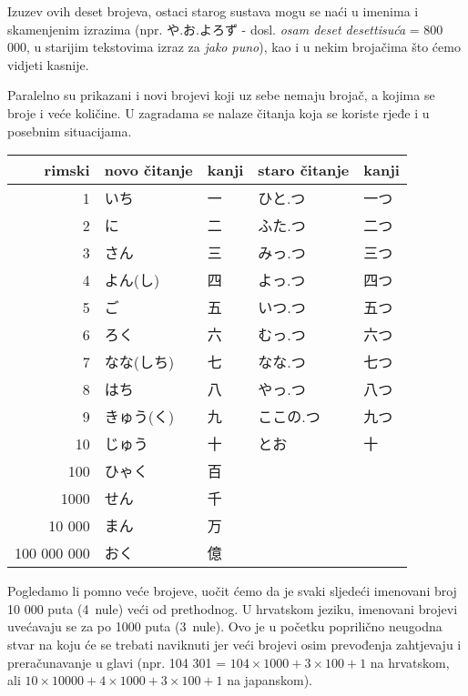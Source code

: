 	Izuzev ovih deset brojeva, ostaci starog sustava mogu se naći u imenima i skamenjenim izrazima (npr. や.お.よろず - dosl. \textit{osam deset desettisuća} = 800 000, u starijim tekstovima izraz za \textit{jako puno}), kao i u nekim brojačima što ćemo vidjeti kasnije.
	
	Paralelno su prikazani i novi brojevi koji uz sebe nemaju brojač, a kojima se broje i veće količine. U zagradama se nalaze čitanja koja se koriste rjeđe i u posebnim situacijama.
	
	\vspace{5pt}
	\begin{table}[h]
		\centering
		\begin{tabular}{r l l l l}\toprule[2pt]
			rimski & novo čitanje & kanji & staro čitanje & kanji\\
			\midrule
			1			& いち & 一 & ひと.つ & 一つ \\
			2			& に & 二 & ふた.つ & 二つ \\
			3			& さん & 三 & みっ.つ & 三つ \\
			4			& よん(し) & 四 & よっ.つ & 四つ \\
			5			& ご & 五 & いつ.つ & 五つ \\
			6			& ろく & 六 & むっ.つ & 六つ \\
			7			& なな(しち) & 七 & なな.つ & 七つ \\
			8			& はち & 八 & やっ.つ & 八つ \\
			9			& きゅう(く) & 九 & ここの.つ & 九つ \\
			10			& じゅう & 十 & とお & 十 \\
			100			& ひゃく & 百 &  &  \\
			1000		& せん & 千 &  &  \\
			10 000		& まん & 万 &  &  \\
			100 000 000	& おく & 億 &  &  \\
			\bottomrule
		\end{tabular}
	\end{table}

	\vspace{5pt}
	Pogledamo li pomno veće brojeve, uočit ćemo da je svaki sljedeći imenovani broj 10 000 puta (4~nule) veći od prethodnog. U hrvatskom jeziku, imenovani brojevi uvećavaju se za po 1000 puta (3~nule). Ovo je u početku poprilično neugodna stvar na koju će se trebati naviknuti jer veći brojevi osim prevođenja zahtjevaju i preračunavanje u glavi (npr. 104 301 = $104\times 1000 + 3\times 100 + 1$ na hrvatskom, ali $10\times 10 000 + 4\times 1000 + 3\times 100 + 1$ na japanskom).

